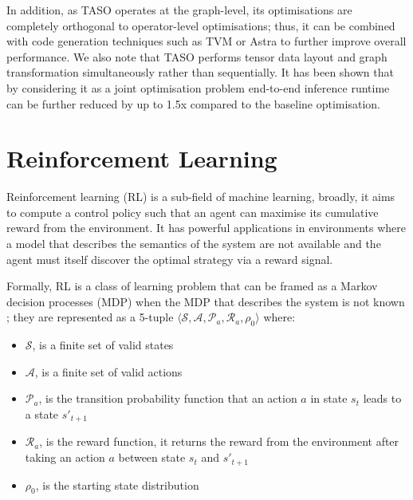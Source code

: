 
In addition, as TASO operates at the graph-level, its optimisations are completely orthogonal to operator-level optimisations; thus, it can be combined with code generation techniques such as TVM \cite{chen2018tvm} or Astra \cite{sivathanu2019astra} to further improve overall performance. We also note that TASO performs tensor data layout and graph transformation simultaneously rather than sequentially. It has been shown that by considering it as a joint optimisation problem end-to-end inference runtime can be further reduced by up to 1.5x \cite{jia2019taso, jia2019optimizing} compared to the baseline optimisation.


\section{Reinforcement Learning}
Reinforcement learning (RL) is a sub-field of machine learning, broadly, it aims to compute a control policy such that an agent can maximise its cumulative reward from the environment. It has powerful applications in environments where a model that describes the semantics of the system are not available and the agent must itself discover the optimal strategy via a reward signal.

Formally, RL is a class of learning problem that can be framed as a Markov decision processes (MDP) when the MDP that describes the system is not known \cite{bellman1957}; they are represented as a 5-tuple $\langle \mathcal{S}, \mathcal{A}, \mathcal{P}_a, \mathcal{R}_a, \rho_0 \rangle$ where:

\begin{itemize}
  \item $\mathcal{S}$, is a finite set of valid states
  \item $\mathcal{A}$, is a finite set of valid actions
  \item $\mathcal{P}_a$, is the transition probability function that an action $a$ in state $s_t$ leads to a state $s'_{t+1}$
  \item $\mathcal{R}_a$, is the reward function, it returns the reward from the environment after taking an action $a$ between state $s_t$ and $s'_{t+1}$
  \item $\rho_0$, is the starting state distribution
\end{itemize}

